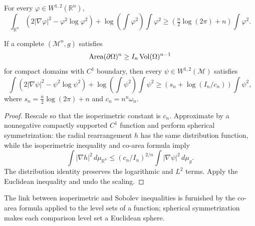 \begin{theorem}
\label{thm:chow-iii-euclidean-log-sobolev}


For every \(\varphi\in W^{1,2}(\mathbb R^n)\),
\[
 \int_{\mathbb R^n}(2|\nabla\varphi|^2-\varphi^2\log\varphi^2)
 +\log\!\left(\int\varphi^2\right)\int\varphi^2
 \ge\left(\tfrac n2\log(2\pi)+n\right)\int\varphi^2.
\]
\end{theorem}

\begin{theorem}
\label{thm:chow-iii-log-sobolev-isoperimetric}


If a complete \((\mathcal M^n,g)\) satisfies
\[
 \operatorname{Area}(\partial\Omega)^n\ge I_n\operatorname{Vol}(\Omega)^{n-1}
\]
for compact domains with \(C^1\) boundary, then every \(\psi\in W^{1,2}(\mathcal M)\)
satisfies
\[
 \int(2|\nabla\psi|^2-\psi^2\log\psi^2)
 +\log\!\left(\int\psi^2\right)\int\psi^2
 \ge\left(s_n+\log(I_n/c_n)\right)\int\psi^2,
\]
where \(s_n=\frac n2\log(2\pi)+n\) and \(c_n=n^n\omega_n\).
\end{theorem}
\begin{proof}
\sketch Rescale so that the isoperimetric constant is \(c_n\).  Approximate by a
nonnegative compactly supported \(C^1\) function and perform spherical
symmetrization: the radial rearrangement \(h\) has the same distribution
function, while the isoperimetric inequality and co-area formula imply
\[
 \int|\nabla h|^2\,d\mu_{\mathbb R^n}
 \le(c_n/I_n)^{2/n}\int|\nabla\psi|^2\,d\mu_g.
\]
The distribution identity preserves the logarithmic and \(L^2\) terms.  Apply
the Euclidean inequality and undo the scaling.
\end{proof}

\begin{remark}
\label{rem:chow-iii-log-sobolev-coarea}


The link between isoperimetric and Sobolev inequalities is furnished by the
co-area formula applied to the level sets of a function; spherical
symmetrization makes each comparison level set a Euclidean sphere.
\end{remark}

